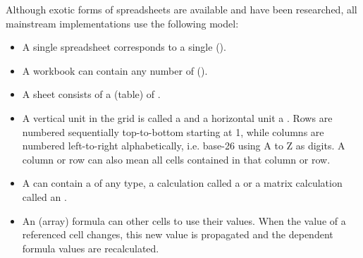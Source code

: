 Although exotic forms of spreadsheets are available and have been researched, all mainstream implementations use the following model:
\begin{itemize}
\item A single spreadsheet  corresponds to a single ().
\item A workbook can contain any number of ().
\item A sheet consists of a  (table) of .
\item A vertical unit in the grid is called a  and a horizontal unit a .
Rows are numbered sequentially top-to-bottom starting at 1, while columns are numbered left-to-right alphabetically, i.e. base-26 using A to Z as digits.
A column or row can also mean all cells contained in that column or row.
\item A  can contain a  of any type, a calculation called a  or a matrix calculation called an .
\item An (array) formula can  other cells to use their values. When the value of a referenced cell changes, this new value is propagated and the dependent formula values are recalculated.
\end{itemize}

